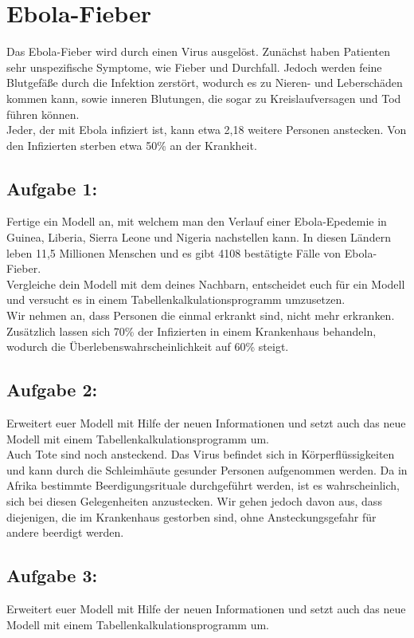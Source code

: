 \documentclass[10pt,a4paper]{article}
\begin{document}
\section*{Ebola-Fieber}
Das Ebola-Fieber wird durch einen Virus ausgelöst. Zunächst haben Patienten sehr unspezifische Symptome, wie Fieber und Durchfall. Jedoch werden feine Blutgefäße durch die Infektion zerstört, wodurch es zu Nieren- und Leberschäden kommen kann, sowie inneren Blutungen, die sogar zu Kreislaufversagen und Tod führen können.\\
Jeder, der mit Ebola infiziert ist, kann etwa 2,18 weitere Personen anstecken. Von den Infizierten sterben etwa 50\% an der Krankheit.\\
\subsection*{Aufgabe 1:}
Fertige ein Modell an, mit welchem man den Verlauf einer Ebola-Epedemie in Guinea, Liberia, Sierra Leone und Nigeria nachstellen kann. In diesen Ländern leben 11,5 Millionen Menschen und es gibt 4108 bestätigte Fälle von Ebola-Fieber.\\
Vergleiche dein Modell mit dem deines Nachbarn, entscheidet euch für ein Modell und versucht es in einem Tabellenkalkulationsprogramm umzusetzen.\\

Wir nehmen an, dass Personen die einmal erkrankt sind, nicht mehr erkranken. Zusätzlich lassen sich 70\% der Infizierten in einem Krankenhaus behandeln, wodurch die Überlebenswahrscheinlichkeit auf 60\% steigt.\\
\subsection*{Aufgabe 2:}
Erweitert euer Modell mit Hilfe der neuen Informationen und setzt auch das neue Modell mit einem Tabellenkalkulationsprogramm um.\\

Auch Tote sind noch ansteckend. Das Virus befindet sich in Körperflüssigkeiten und kann durch die Schleimhäute gesunder Personen aufgenommen werden. Da in Afrika bestimmte Beerdigungsrituale durchgeführt werden, ist es wahrscheinlich, sich bei diesen Gelegenheiten anzustecken. Wir gehen jedoch davon aus, dass diejenigen, die im Krankenhaus gestorben sind, ohne Ansteckungsgefahr für andere beerdigt werden.\\
\subsection*{Aufgabe 3:}
Erweitert euer Modell mit Hilfe der neuen Informationen und setzt auch das neue Modell mit einem Tabellenkalkulationsprogramm um. 
\end{document}
